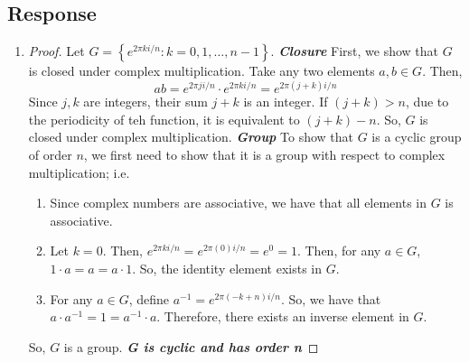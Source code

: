 \documentclass[13pt]{article}
\begin{document}
\subsection*{Response}
\begin{enumerate}[label=(\alph*)]
    \item 
        \begin{proof}
            Let $G = \left\{ e^{2 \pi k i / n} : k = 0, 1, \ldots, n - 1 \right\}$.
            \newline
            \newline
            \textit{\textbf{Closure}}
            \newline
            First, we show that $G$ is closed under complex multiplication. Take any two elements
            $a, b \in G$. Then,
            \[
                ab = e^{2 \pi j i / n} \cdot e^{2 \pi k i / n}
                = e^{2 \pi (j + k) i / n}
            \]
            Since $j, k$ are integers, their sum $j + k$ is an integer. 
            If $(j + k) > n$, due to the periodicity of teh function, it is equivalent to $(j + k) - n$.
            So, $G$ is closed under complex multiplication.
            \newline
            \newline
            \textit{\textbf{Group}}
            \newline
            To show that $G$ is a cyclic group of order $n$, we first need to show that it is a 
            group with respect to complex multiplication; i.e.
            \begin{enumerate}[label=\textit{(\roman*)}]
                \item 
                    Since complex numbers are associative, we have that all elements in $G$ is 
                    associative.
                \item 
                    Let $k = 0$. Then, $e^{2 \pi k i / n} = e^{2 \pi (0) i / n} = e^0 = 1$. Then, for
                    any $a \in G$, $1 \cdot a = a = a \cdot 1$. So, the identity element exists in $G$.
                \item For any $a \in G$, define $a^{-1} = e^{2 \pi (-k + n) i / n}$. So, we have that 
                    $a \cdot a^{-1} = 1 = a^{-1} \cdot a$. Therefore, there exists an inverse element in $G$.
            \end{enumerate}
            So, $G$ is a group.
            \newline
            \newline
            \textit{\textbf{G is cyclic and has order n}}

\end{proof}
\end{enumerate}
\end{document}
